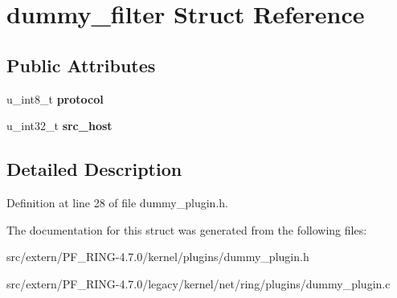 \hypertarget{structdummy__filter}{
\section{dummy\_\-filter Struct Reference}
\label{structdummy__filter}
}
\subsection*{Public Attributes}
\begin{DoxyCompactItemize}
\item 
\hypertarget{structdummy__filter_a9be9effeb65cbbf3727ff4640bad282c}{
u\_\-int8\_\-t {\bfseries protocol}}
\label{structdummy__filter_a9be9effeb65cbbf3727ff4640bad282c}

\item 
\hypertarget{structdummy__filter_ad3a119deeb668f0657a7cb5d94124914}{
u\_\-int32\_\-t {\bfseries src\_\-host}}
\label{structdummy__filter_ad3a119deeb668f0657a7cb5d94124914}

\end{DoxyCompactItemize}


\subsection{Detailed Description}


Definition at line 28 of file dummy\_\-plugin.h.



The documentation for this struct was generated from the following files:\begin{DoxyCompactItemize}
\item 
src/extern/PF\_\-RING-\/4.7.0/kernel/plugins/dummy\_\-plugin.h\item 
src/extern/PF\_\-RING-\/4.7.0/legacy/kernel/net/ring/plugins/dummy\_\-plugin.c\end{DoxyCompactItemize}
